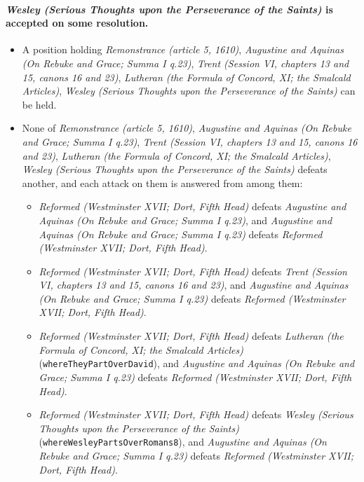 \documentclass[11pt]{article}
\begin{document}
\paragraph{\emph{Wesley (Serious Thoughts upon the Perseverance of the Saints)} is accepted on some resolution.}
\begin{itemize}
\item A position holding \emph{Remonstrance (article 5, 1610)}, \emph{Augustine and Aquinas (On Rebuke and Grace; Summa I q.23)}, \emph{Trent (Session VI, chapters 13 and 15, canons 16 and 23)}, \emph{Lutheran (the Formula of Concord, XI; the Smalcald Articles)}, \emph{Wesley (Serious Thoughts upon the Perseverance of the Saints)} can be held.
\item None of \emph{Remonstrance (article 5, 1610)}, \emph{Augustine and Aquinas (On Rebuke and Grace; Summa I q.23)}, \emph{Trent (Session VI, chapters 13 and 15, canons 16 and 23)}, \emph{Lutheran (the Formula of Concord, XI; the Smalcald Articles)}, \emph{Wesley (Serious Thoughts upon the Perseverance of the Saints)} defeats another, and each attack on them is answered from among them:
\begin{itemize}
\item \emph{Reformed (Westminster XVII; Dort, Fifth Head)} defeats \emph{Augustine and Aquinas (On Rebuke and Grace; Summa I q.23)}, and \emph{Augustine and Aquinas (On Rebuke and Grace; Summa I q.23)} defeats \emph{Reformed (Westminster XVII; Dort, Fifth Head)}.
\item \emph{Reformed (Westminster XVII; Dort, Fifth Head)} defeats \emph{Trent (Session VI, chapters 13 and 15, canons 16 and 23)}, and \emph{Augustine and Aquinas (On Rebuke and Grace; Summa I q.23)} defeats \emph{Reformed (Westminster XVII; Dort, Fifth Head)}.
\item \emph{Reformed (Westminster XVII; Dort, Fifth Head)} defeats \emph{Lutheran (the Formula of Concord, XI; the Smalcald Articles)} (\texttt{where\allowbreak{}They\allowbreak{}Part\allowbreak{}Over\allowbreak{}David}), and \emph{Augustine and Aquinas (On Rebuke and Grace; Summa I q.23)} defeats \emph{Reformed (Westminster XVII; Dort, Fifth Head)}.
\item \emph{Reformed (Westminster XVII; Dort, Fifth Head)} defeats \emph{Wesley (Serious Thoughts upon the Perseverance of the Saints)} (\texttt{where\allowbreak{}Wesley\allowbreak{}Parts\allowbreak{}Over\allowbreak{}Romans8}), and \emph{Augustine and Aquinas (On Rebuke and Grace; Summa I q.23)} defeats \emph{Reformed (Westminster XVII; Dort, Fifth Head)}.
\end{itemize}
\end{itemize}
\end{document}
